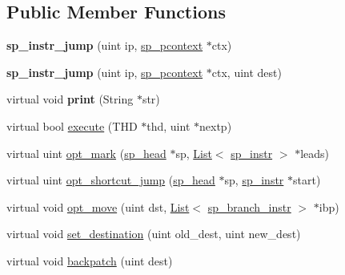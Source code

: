 \subsection*{Public Member Functions}
\begin{DoxyCompactItemize}
\item 
\mbox{\label{classsp__instr__jump_a3c1f0bf4af9a476c52e662cbcb854427}} 
{\bfseries sp\+\_\+instr\+\_\+jump} (uint ip, \mbox{\hyperlink{classsp__pcontext}{sp\+\_\+pcontext}} $\ast$ctx)
\item 
\mbox{\label{classsp__instr__jump_a5cdf5b452566a03d3229acca3c3d1b21}} 
{\bfseries sp\+\_\+instr\+\_\+jump} (uint ip, \mbox{\hyperlink{classsp__pcontext}{sp\+\_\+pcontext}} $\ast$ctx, uint dest)
\item 
\mbox{\label{classsp__instr__jump_a08f56fe5d0500607bb76d056a1d2abf7}} 
virtual void {\bfseries print} (String $\ast$str)
\item 
virtual bool \mbox{\hyperlink{classsp__instr__jump_a2b76438345358e22b6029129828d66d5}{execute}} (T\+HD $\ast$thd, uint $\ast$nextp)
\item 
virtual uint \mbox{\hyperlink{classsp__instr__jump_a4daedb439c97a78adf9957fc35121dbe}{opt\+\_\+mark}} (\mbox{\hyperlink{classsp__head}{sp\+\_\+head}} $\ast$sp, \mbox{\hyperlink{classList}{List}}$<$ \mbox{\hyperlink{classsp__instr}{sp\+\_\+instr}} $>$ $\ast$leads)
\item 
virtual uint \mbox{\hyperlink{classsp__instr__jump_a7c0f595bd9f39e9b38cc1e06333c3db0}{opt\+\_\+shortcut\+\_\+jump}} (\mbox{\hyperlink{classsp__head}{sp\+\_\+head}} $\ast$sp, \mbox{\hyperlink{classsp__instr}{sp\+\_\+instr}} $\ast$start)
\item 
virtual void \mbox{\hyperlink{classsp__instr__jump_a84478dd9ceeedc8693c60d77d24816f7}{opt\+\_\+move}} (uint dst, \mbox{\hyperlink{classList}{List}}$<$ \mbox{\hyperlink{classsp__branch__instr}{sp\+\_\+branch\+\_\+instr}} $>$ $\ast$ibp)
\item 
virtual void \mbox{\hyperlink{classsp__instr__jump_aee2d8071b4f12109135a0e22a9ba3c71}{set\+\_\+destination}} (uint old\+\_\+dest, uint new\+\_\+dest)
\item 
virtual void \mbox{\hyperlink{classsp__instr__jump_ad4ac1776111c39aa6d2af89b0ffe0af6}{backpatch}} (uint dest)
\end{DoxyCompactItemize}
